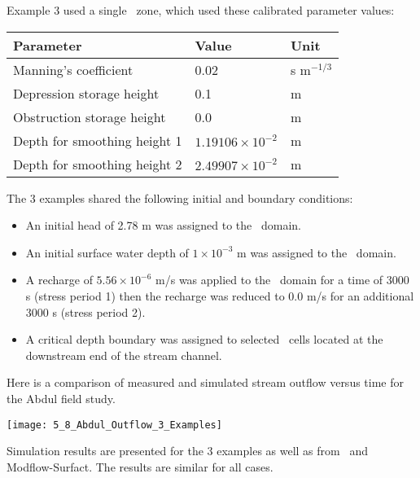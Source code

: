 Example 3 used a single \swf\ zone, which used these calibrated parameter values:

\begin{center}
    \begin{tabular}{lll}  \hline
        Parameter                           & Value                         &   Unit            \\ \hline
        Manning's coefficient               &  0.02                         &   s m$^{-1/3}$   \\
        Depression storage height           &  0.1                          &   m               \\
        Obstruction storage height          &  0.0                          &   m               \\
        Depth for smoothing height 1        &  $1.19106 \times 10^{-2}$     &   m               \\
        Depth for smoothing height 2        &  $2.49907 \times 10^{-2}$     &   m               \\
    \hline
    \end{tabular}
\end{center}

The 3 examples shared the following initial and boundary conditions:
\begin{itemize}
    \item An initial head of 2.78 m was assigned to the \gwf\ domain.
    \item An initial surface water depth of $1 \times 10^{-3}$  m was assigned to the \swf\ domain.
    \item A recharge of $5.56 \times 10^{-6}$ m/s was applied to the \swf\ domain for a time of 3000 s (stress period 1) then the recharge was reduced to 0.0 m/s for an additional 3000 s (stress period 2).
    \item A critical depth boundary was assigned to selected \swf\ cells located at the downstream end of the stream channel.
\end{itemize}

\pagebreak
Here is a comparison of measured and simulated stream outflow versus time for the Abdul field study.

\texttt{[image: 5\_8\_Abdul\_Outflow\_3\_Examples]}

Simulation results are presented for the 3 examples as well as from \hgs\ and {\sc Modflow-Surfact}.  The results are similar for all cases.


